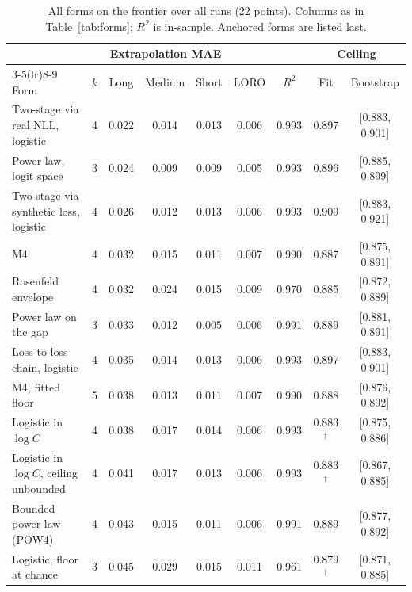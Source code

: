 \begin{table}[h]
  \centering
  \caption{All forms on the frontier over all runs (22 points). Columns as in Table~\ref{tab:forms}; $R^2$ is
  in-sample. Anchored forms are listed last.}
  \label{tab:forms-full}
  \scriptsize
  \setlength{\tabcolsep}{3pt}
  \begin{tabular}{lcccccccc}
    \toprule
    & & \multicolumn{3}{c}{Extrapolation MAE} & & & \multicolumn{2}{c}{Ceiling} \\
    \cmidrule(lr){3-5}\cmidrule(lr){8-9}
    Form & $k$ & Long & Medium & Short & LORO & $R^2$ & Fit & Bootstrap \\
    \midrule
    Two-stage via real NLL, logistic                 & 4 & 0.022 & 0.014 & 0.013 & 0.006 & 0.993 & 0.897 & [0.883, 0.901] \\
    Power law, logit space                           & 3 & 0.024 & 0.009 & 0.009 & 0.005 & 0.993 & 0.896 & [0.885, 0.899] \\
    Two-stage via synthetic loss, logistic           & 4 & 0.026 & 0.012 & 0.013 & 0.006 & 0.993 & 0.909 & [0.883, 0.921] \\
    M4                                               & 4 & 0.032 & 0.015 & 0.011 & 0.007 & 0.990 & 0.887 & [0.875, 0.891] \\
    Rosenfeld envelope                               & 4 & 0.032 & 0.024 & 0.015 & 0.009 & 0.970 & 0.885 & [0.872, 0.889] \\
    Power law on the gap                             & 3 & 0.033 & 0.012 & 0.005 & 0.006 & 0.991 & 0.889 & [0.881, 0.891] \\
    Loss-to-loss chain, logistic                     & 4 & 0.035 & 0.014 & 0.013 & 0.006 & 0.993 & 0.897 & [0.883, 0.901] \\
    M4, fitted floor                                 & 5 & 0.038 & 0.013 & 0.011 & 0.007 & 0.990 & 0.888 & [0.876, 0.892] \\
    Logistic in $\log C$                             & 4 & 0.038 & 0.017 & 0.014 & 0.006 & 0.993 & 0.883$^{\dagger}$ & [0.875, 0.886] \\
    Logistic in $\log C$, ceiling unbounded          & 4 & 0.041 & 0.017 & 0.013 & 0.006 & 0.993 & 0.883$^{\dagger}$ & [0.867, 0.885] \\
    Bounded power law (POW4)                         & 4 & 0.043 & 0.015 & 0.011 & 0.006 & 0.991 & 0.889 & [0.877, 0.892] \\
    Logistic, floor at chance                        & 3 & 0.045 & 0.029 & 0.015 & 0.011 & 0.961 & 0.879$^{\dagger}$ & [0.871, 0.885] \\

\end{tabular}
\end{table}
